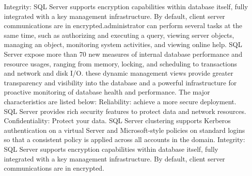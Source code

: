 Integrity: SQL Server supports encryption capabilities within database itself, fully integrated with a key management infrastructure. By default, client server communications are in encrypted.administrator can perform several tasks at the same time, such as authorizing and executing a query, viewing server objects, managing an object, monitoring system activities, and viewing online help.
SQL Server expose more than 70 new measures of internal database performance and resource usages, ranging from memory, locking, and scheduling to transactions and network and disk I/O. these dynamic management views provide greater transparency and visibility into the database and a powerful infrastructure for proactive monitoring of database health and performance. The major characteristics are listed below:
Reliability: achieve a more secure deployment. SQL Server provides rich security features to protect data and network resources.
Confidentiality: Protect your data. SQL Server clustering supports Kerberos authentication on a virtual Server and Microsoft-style policies on standard logins so that a consistent policy is applied across all accounts in the domain.
Integrity: SQL Server supports encryption capabilities within database itself, fully integrated with a key management infrastructure. By default, client server communications are in encrypted.
